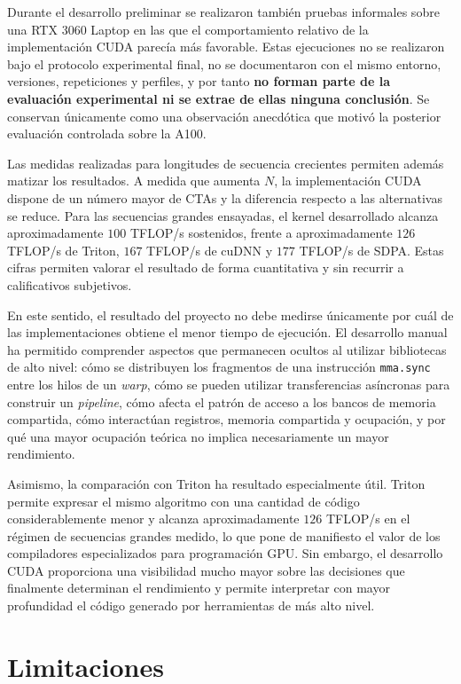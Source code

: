 Durante el desarrollo preliminar se realizaron también pruebas informales sobre una RTX 3060 Laptop en las que el comportamiento relativo de la implementación CUDA parecía más favorable. Estas ejecuciones no se realizaron bajo el protocolo experimental final, no se documentaron con el mismo entorno, versiones, repeticiones y perfiles, y por tanto \textbf{no forman parte de la evaluación experimental ni se extrae de ellas ninguna conclusión}. Se conservan únicamente como una observación anecdótica que motivó la posterior evaluación controlada sobre la A100.

Las medidas realizadas para longitudes de secuencia crecientes permiten además matizar los resultados. A medida que aumenta \(N\), la implementación CUDA dispone de un número mayor de CTAs y la diferencia respecto a las alternativas se reduce. Para las secuencias grandes ensayadas, el kernel desarrollado alcanza aproximadamente \(100\) TFLOP/s sostenidos, frente a aproximadamente \(126\) TFLOP/s de Triton, \(167\) TFLOP/s de cuDNN y \(177\) TFLOP/s de SDPA. Estas cifras permiten valorar el resultado de forma cuantitativa y sin recurrir a calificativos subjetivos.

En este sentido, el resultado del proyecto no debe medirse únicamente por cuál de las implementaciones obtiene el menor tiempo de ejecución. El desarrollo manual ha permitido comprender aspectos que permanecen ocultos al utilizar bibliotecas de alto nivel: cómo se distribuyen los fragmentos de una instrucción \texttt{mma.sync} entre los hilos de un \textit{warp}, cómo se pueden utilizar transferencias asíncronas para construir un \textit{pipeline}, cómo afecta el patrón de acceso a los bancos de memoria compartida, cómo interactúan registros, memoria compartida y ocupación, y por qué una mayor ocupación teórica no implica necesariamente un mayor rendimiento.

Asimismo, la comparación con Triton ha resultado especialmente útil. Triton permite expresar el mismo algoritmo con una cantidad de código considerablemente menor y alcanza aproximadamente \(126\) TFLOP/s en el régimen de secuencias grandes medido, lo que pone de manifiesto el valor de los compiladores especializados para programación GPU. Sin embargo, el desarrollo CUDA proporciona una visibilidad mucho mayor sobre las decisiones que finalmente determinan el rendimiento y permite interpretar con mayor profundidad el código generado por herramientas de más alto nivel.

\section{Limitaciones}

